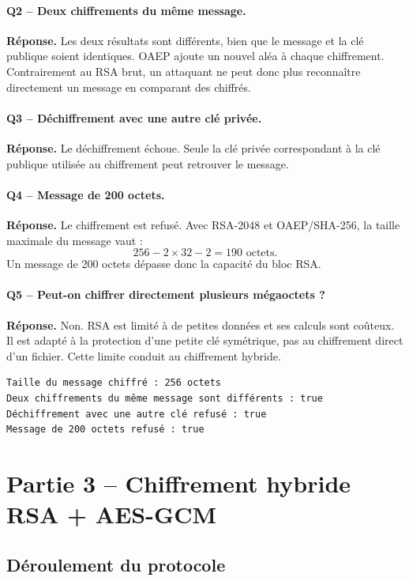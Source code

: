 \documentclass[11pt,a4paper]{article}
\newcommand{\reponse}{\textbf{Réponse.} }
\begin{document}
\paragraph{Q2 -- Deux chiffrements du même message.}
\reponse Les deux résultats sont différents, bien que le message et la clé publique
soient identiques. OAEP ajoute un nouvel aléa à chaque chiffrement. Contrairement au
RSA brut, un attaquant ne peut donc plus reconnaître directement un message en
comparant des chiffrés.

\paragraph{Q3 -- Déchiffrement avec une autre clé privée.}
\reponse Le déchiffrement échoue. Seule la clé privée correspondant à la clé publique
utilisée au chiffrement peut retrouver le message.

\paragraph{Q4 -- Message de 200 octets.}
\reponse Le chiffrement est refusé. Avec RSA-2048 et OAEP/SHA-256, la taille maximale
du message vaut :
\[
    256-2\times 32-2=190\text{ octets}.
\]
Un message de 200 octets dépasse donc la capacité du bloc RSA.

\paragraph{Q5 -- Peut-on chiffrer directement plusieurs mégaoctets ?}
\reponse Non. RSA est limité à de petites données et ses calculs sont coûteux. Il est
adapté à la protection d'une petite clé symétrique, pas au chiffrement direct d'un
fichier. Cette limite conduit au chiffrement hybride.

\begin{verbatim}
Taille du message chiffré : 256 octets
Deux chiffrements du même message sont différents : true
Déchiffrement avec une autre clé refusé : true
Message de 200 octets refusé : true
\end{verbatim}

\section{Partie 3 -- Chiffrement hybride RSA + AES-GCM}

\subsection{Déroulement du protocole}
\end{document}
